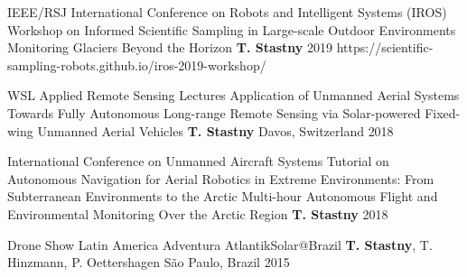\label{sec:talks}

\begin{cventries}

\cvtalkentry
	{IEEE/RSJ International Conference on Robots and Intelligent Systems (IROS)} %
	{Workshop on Informed Scientific Sampling in Large-scale Outdoor Environments} %
	{Monitoring Glaciers Beyond the Horizon} %
	{\textbf{T. Stastny}} %
	{} %
	{2019} %
	{https://scientific-sampling-robots.github.io/iros-2019-workshop/} %
	
\cvtalkentry
	{WSL Applied Remote Sensing Lectures} %
	{Application of Unmanned Aerial Systems} %
	{Towards Fully Autonomous Long-range Remote Sensing via Solar-powered Fixed-wing Unmanned Aerial Vehicles} %
	{\textbf{T. Stastny}} %
	{Davos, Switzerland} %
	{2018} %
	{} %
	
\vspace*{-9pt}
\cvtalkentry
	{International Conference on Unmanned Aircraft Systems} %
	{Tutorial on Autonomous Navigation for Aerial Robotics in Extreme Environments: From Subterranean Environments to the Arctic} %
	{Multi-hour Autonomous Flight and Environmental Monitoring Over the Arctic Region} %
	{\textbf{T. Stastny}} %
	{} %
	{2018} %
	{} %
	
\vspace*{-9pt}
\cvtalkentry
	{Drone Show Latin America} %
	{} %
	{Adventura AtlantikSolar@Brazil} %
	{\textbf{T. Stastny}, T. Hinzmann, P. Oettershagen} %
	{S\~{a}o Paulo, Brazil} %
	{2015} %
	{} %

\end{cventries}
